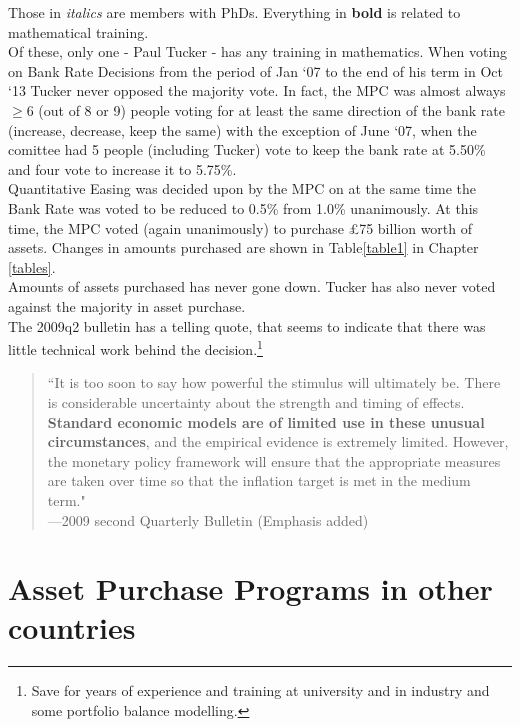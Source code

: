 \documentclass[notitlepage,12pt]{report}
\begin{document}
\hfill

Those in {\it italics} are members with PhDs. Everything in {\bf bold} is related to mathematical training.\\

Of these, only one - Paul Tucker - has any training in mathematics. When voting on Bank Rate Decisions from the period of Jan `07 to the end of his term in Oct `13 Tucker never opposed the majority vote.\cite{boe_minutes} In fact, the MPC was almost always \(\geq6\) (out of 8 or 9) people voting for at least the same direction of the bank rate (increase, decrease, keep the same) with the exception of June `07, when the comittee had 5 people (including Tucker) vote to keep the bank rate at 5.50\% and four vote to increase it to 5.75\%.\\
Quantitative Easing was decided upon by the MPC on \cite{bedford_quantitative_2009} at the same time the Bank Rate was voted to be reduced to 0.5\% from 1.0\% unanimously.\cite{boe_minutes} At this time, the MPC voted (again unanimously) to purchase £75 billion worth of assets. Changes in amounts purchased are shown in Table\ref{table1} in Chapter \ref{tables}.\\
Amounts of assets purchased has never gone down. Tucker has also never voted against the majority in asset purchase.\\

The 2009q2 bulletin has a telling quote, that seems to indicate that there was little technical work behind the decision.\footnote{Save for years of experience and training at university and in industry and some portfolio balance modelling.}

\begin{quote}
``It is too soon to say how powerful the stimulus will ultimately be. There is considerable uncertainty about the strength and timing of effects. {\bf Standard economic models are of limited use in these unusual circumstances}, and the empirical evidence is extremely limited. However, the monetary policy framework will ensure that the appropriate measures are taken over time so that the inflation target is met in the medium term."\\
---2009 second Quarterly Bulletin\cite[conclusion, p.99]{noauthor_quantitative_nodate} (Emphasis added)
\end{quote}

\section{Asset Purchase Programs in other countries}
\end{document}
